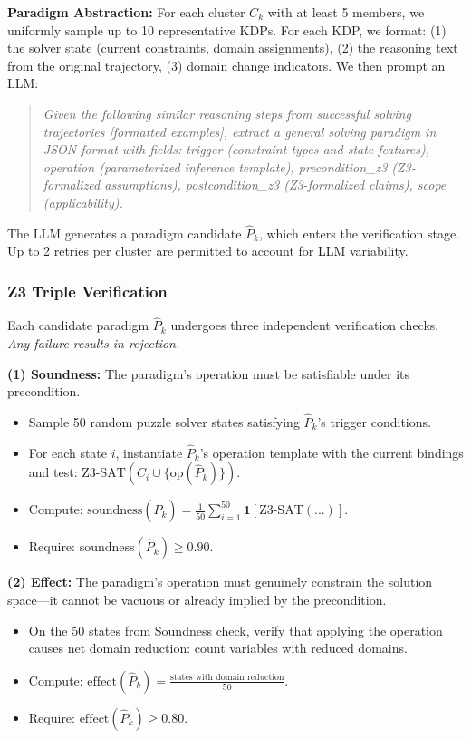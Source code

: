 \textbf{Paradigm Abstraction:} For each cluster $C_k$ with at least 5 members, we uniformly sample up to 10 representative KDPs. For each KDP, we format: (1) the solver state (current constraints, domain assignments), (2) the reasoning text from the original trajectory, (3) domain change indicators. We then prompt an LLM:

\begin{quote}
\textit{Given the following similar reasoning steps from successful solving trajectories [formatted examples], extract a general solving paradigm in JSON format with fields: trigger (constraint types and state features), operation (parameterized inference template), precondition\_z3 (Z3-formalized assumptions), postcondition\_z3 (Z3-formalized claims), scope (applicability).}
\end{quote}

The LLM generates a paradigm candidate $\hat{P}_k$, which enters the verification stage. Up to 2 retries per cluster are permitted to account for LLM variability.

\subsubsection{Z3 Triple Verification}

Each candidate paradigm $\hat{P}_k$ undergoes three independent verification checks. \textit{Any failure results in rejection.}

\textbf{(1) Soundness:} The paradigm's operation must be satisfiable under its precondition.
\begin{itemize}
    \item Sample 50 random puzzle solver states satisfying $\hat{P}_k$'s trigger conditions.
    \item For each state $i$, instantiate $\hat{P}_k$'s operation template with the current bindings and test: $\text{Z3-SAT}(C_i \cup \{\text{op}(\hat{P}_k)\})$.
    \item Compute: $\text{soundness}(\hat{P}_k) = \frac{1}{50}\sum_{i=1}^{50} \mathbf{1}[\text{Z3-SAT}(...)]$.
    \item Require: $\text{soundness}(\hat{P}_k) \geq 0.90$.
\end{itemize}

\textbf{(2) Effect:} The paradigm's operation must genuinely constrain the solution space—it cannot be vacuous or already implied by the precondition.
\begin{itemize}
    \item On the 50 states from Soundness check, verify that applying the operation causes net domain reduction: count variables with reduced domains.
    \item Compute: $\text{effect}(\hat{P}_k) = \frac{\text{states with domain reduction}}{50}$.
    \item Require: $\text{effect}(\hat{P}_k) \geq 0.80$.
\end{itemize}

